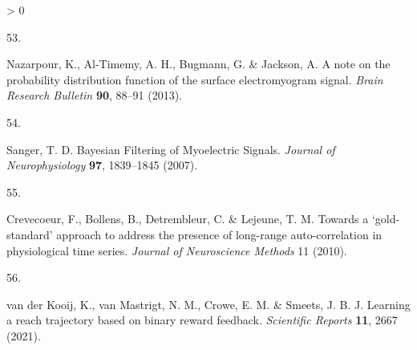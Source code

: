 \documentclass[
  a4paper,
]{article}
\newlength{\cslhangindent}
\newlength{\csllabelwidth}
\newenvironment{CSLReferences}[2] %
 {%
  \setlength{\parindent}{0pt}
  \ifodd #1 \everypar{\setlength{\hangindent}{\cslhangindent}}\ignorespaces\fi
  \ifnum #2 > 0
  \setlength{\parskip}{#2\baselineskip}
  \fi
 }%
 {}
\newcommand{\CSLLeftMargin}[1]{\parbox[t]{\csllabelwidth}{#1}}
\newcommand{\CSLRightInline}[1]{\parbox[t]{\linewidth - \csllabelwidth}{#1}\break}
\begin{document}
\begin{CSLReferences}{0}{0}
\leavevmode\hypertarget{ref-nazarpourNoteProbabilityDistribution2013}{}%
\CSLLeftMargin{53. }
\CSLRightInline{Nazarpour, K., Al-Timemy, A. H., Bugmann, G. \& Jackson,
A. A note on the probability distribution function of the surface
electromyogram signal. \emph{Brain Research Bulletin} \textbf{90},
88--91 (2013).}

\leavevmode\hypertarget{ref-sangerBayesianFilteringMyoelectric2007}{}%
\CSLLeftMargin{54. }
\CSLRightInline{Sanger, T. D. Bayesian {Filtering} of {Myoelectric
Signals}. \emph{Journal of Neurophysiology} \textbf{97}, 1839--1845
(2007).}

\leavevmode\hypertarget{ref-crevecoeurGoldstandardApproachAddress2010}{}%
\CSLLeftMargin{55. }
\CSLRightInline{Crevecoeur, F., Bollens, B., Detrembleur, C. \& Lejeune,
T. M. Towards a {`gold-standard'} approach to address the presence of
long-range auto-correlation in physiological time series. \emph{Journal
of Neuroscience Methods} 11 (2010).}

\leavevmode\hypertarget{ref-vanderkooijLearningReachTrajectory2021}{}%
\CSLLeftMargin{56. }
\CSLRightInline{van der Kooij, K., van Mastrigt, N. M., Crowe, E. M. \&
Smeets, J. B. J. Learning a reach trajectory based on binary reward
feedback. \emph{Scientific Reports} \textbf{11}, 2667 (2021).}

\end{CSLReferences}
\end{document}
